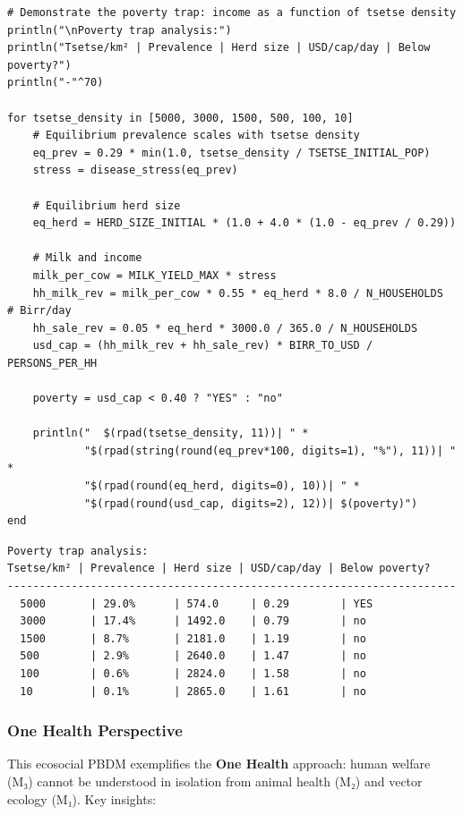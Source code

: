 \begin{verbatim}
# Demonstrate the poverty trap: income as a function of tsetse density
println("\nPoverty trap analysis:")
println("Tsetse/km² | Prevalence | Herd size | USD/cap/day | Below poverty?")
println("-"^70)

for tsetse_density in [5000, 3000, 1500, 500, 100, 10]
    # Equilibrium prevalence scales with tsetse density
    eq_prev = 0.29 * min(1.0, tsetse_density / TSETSE_INITIAL_POP)
    stress = disease_stress(eq_prev)

    # Equilibrium herd size
    eq_herd = HERD_SIZE_INITIAL * (1.0 + 4.0 * (1.0 - eq_prev / 0.29))

    # Milk and income
    milk_per_cow = MILK_YIELD_MAX * stress
    hh_milk_rev = milk_per_cow * 0.55 * eq_herd * 8.0 / N_HOUSEHOLDS  # Birr/day
    hh_sale_rev = 0.05 * eq_herd * 3000.0 / 365.0 / N_HOUSEHOLDS
    usd_cap = (hh_milk_rev + hh_sale_rev) * BIRR_TO_USD / PERSONS_PER_HH

    poverty = usd_cap < 0.40 ? "YES" : "no"

    println("  $(rpad(tsetse_density, 11))| " *
            "$(rpad(string(round(eq_prev*100, digits=1), "%"), 11))| " *
            "$(rpad(round(eq_herd, digits=0), 10))| " *
            "$(rpad(round(usd_cap, digits=2), 12))| $(poverty)")
end
\end{verbatim}




\begin{verbatim}
Poverty trap analysis:
Tsetse/km² | Prevalence | Herd size | USD/cap/day | Below poverty?
----------------------------------------------------------------------
  5000       | 29.0%      | 574.0     | 0.29        | YES
  3000       | 17.4%      | 1492.0    | 0.79        | no
  1500       | 8.7%       | 2181.0    | 1.19        | no
  500        | 2.9%       | 2640.0    | 1.47        | no
  100        | 0.6%       | 2824.0    | 1.58        | no
  10         | 0.1%       | 2865.0    | 1.61        | no
\end{verbatim}



\subsubsection{One Health Perspective}



\label{16403985403245083064}{}


This ecosocial PBDM exemplifies the \textbf{One Health} approach: human welfare (M₃) cannot be understood in isolation from animal health (M₂) and vector ecology (M₁). Key insights:




